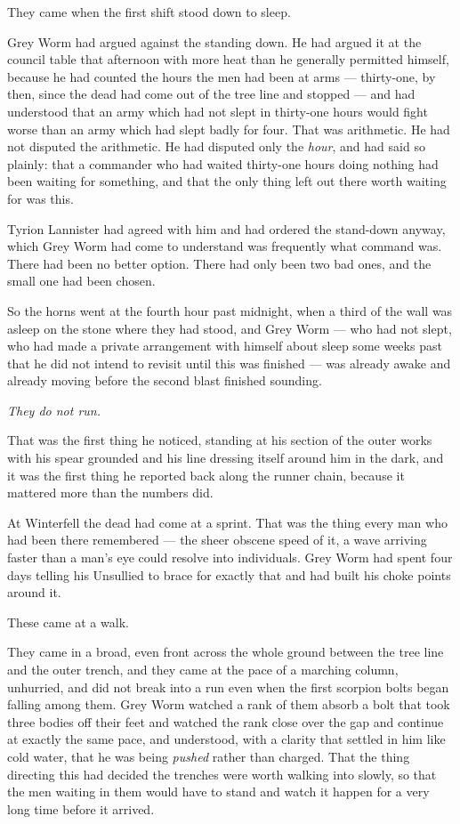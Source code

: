 They came when the first shift stood down to sleep.

Grey Worm had argued against the standing down. He had argued it at the council table that afternoon with more heat than he generally permitted himself, because he had counted the hours the men had been at arms — thirty-one, by then, since the dead had come out of the tree line and stopped — and had understood that an army which had not slept in thirty-one hours would fight worse than an army which had slept badly for four. That was arithmetic. He had not disputed the arithmetic. He had disputed only the \textit{hour}, and had said so plainly: that a commander who had waited thirty-one hours doing nothing had been waiting for something, and that the only thing left out there worth waiting for was this.

Tyrion Lannister had agreed with him and had ordered the stand-down anyway, which Grey Worm had come to understand was frequently what command was. There had been no better option. There had only been two bad ones, and the small one had been chosen.

So the horns went at the fourth hour past midnight, when a third of the wall was asleep on the stone where they had stood, and Grey Worm — who had not slept, who had made a private arrangement with himself about sleep some weeks past that he did not intend to revisit until this was finished — was already awake and already moving before the second blast finished sounding.

\sceneBreak

\textit{They do not run.}

That was the first thing he noticed, standing at his section of the outer works with his spear grounded and his line dressing itself around him in the dark, and it was the first thing he reported back along the runner chain, because it mattered more than the numbers did.

At Winterfell the dead had come at a sprint. That was the thing every man who had been there remembered — the sheer obscene speed of it, a wave arriving faster than a man’s eye could resolve into individuals. Grey Worm had spent four days telling his Unsullied to brace for exactly that and had built his choke points around it.

These came at a walk.

They came in a broad, even front across the whole ground between the tree line and the outer trench, and they came at the pace of a marching column, unhurried, and did not break into a run even when the first scorpion bolts began falling among them. Grey Worm watched a rank of them absorb a bolt that took three bodies off their feet and watched the rank close over the gap and continue at exactly the same pace, and understood, with a clarity that settled in him like cold water, that he was being \textit{pushed} rather than charged. That the thing directing this had decided the trenches were worth walking into slowly, so that the men waiting in them would have to stand and watch it happen for a very long time before it arrived.

